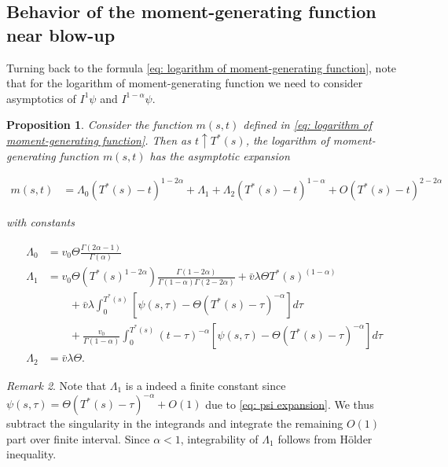 \documentclass[12pt,twoside]{article}
\theoremstyle{plain}
\theoremstyle{plain}
\newtheorem{proposition}{Proposition}[section]
\theoremstyle{definition}
\theoremstyle{remark}
\newtheorem{remark}[proposition]{Remark}
\numberwithin{equation}{section}
\begin{document}
\subsection{Behavior of the moment-generating function near blow-up}

Turning back to the formula \eqref{eq: logarithm of moment-generating function}, note that for the logarithm of moment-generating function we need to consider asymptotics of $I^1\psi$ and $I^{1-\alpha}\psi$.

\begin{proposition}

Consider the function $m(s,t)$ defined in \eqref{eq: logarithm of moment-generating function}. Then as $t \uparrow T^*(s)$, the logarithm of moment-generating function $m(s, t)$ has the asymptotic expansion

\begin{equation}
\label{logarithm of moment-generating functionexpansion}
\begin{aligned}
m(s, t) &= \Lambda_0 (T^*(s)-t)^{1-2\alpha}
+ \Lambda_1 + \Lambda_2 (T^*(s)-t)^{1-\alpha} + O(T^*(s)-t)^{2-2\alpha}
\end{aligned}
\end{equation}

with constants

$$
\begin{aligned}
\Lambda_0 &= v_0 \Theta \frac{ \Gamma(2\alpha - 1)}{\Gamma(\alpha)}\\[10pt]
\Lambda_1 &= v_0\Theta \left(T^*(s)^{1-2\alpha}\right) \frac{\Gamma(1-2\alpha)}{\Gamma(1-\alpha)\Gamma(2-2\alpha)} + \bar v \lambda\Theta T^*(s)^{(1-\alpha)}\\
&\qquad + \bar v \lambda \int _0^{T^*(s)} \left[\psi(s,\tau) - \Theta(T^*(s)-\tau)^{-\alpha}\right] d\tau \\
&\qquad +  \frac{v_0}{\Gamma(1-\alpha)} \int _0^{T^*(s)}(t-\tau)^{-\alpha}\left[\psi(s,\tau) - \Theta(T^*(s)-\tau)^{-\alpha} \right] d\tau \\[10pt]
\Lambda_2 &= \bar v \lambda \Theta.
\end{aligned}
$$

\end{proposition}

\vspace{10pt}

\begin{remark}
Note that $\Lambda_1$ is a indeed a finite constant since $\psi(s,\tau) = \Theta(T^*(s)-\tau)^{-\alpha} + O(1)$ due to \eqref{eq: psi expansion}. We thus subtract the singularity in the integrands and integrate the remaining $O(1)$ part over finite interval. Since $\alpha < 1$, integrability of $\Lambda_1$ follows from Hölder inequality.
\end{remark}
\end{document}
